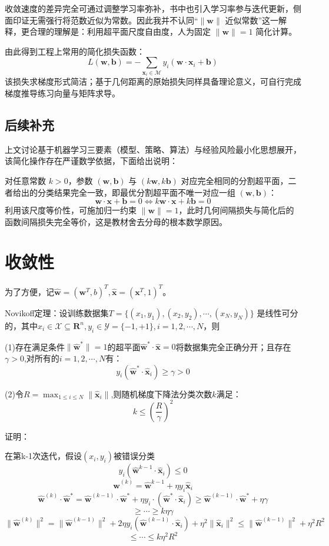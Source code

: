 \documentclass{article}
\begin{document}
收敛速度的差异完全可通过调整学习率弥补，书中也引入学习率参与迭代更新，侧面印证无需强行将范数近似为常数。因此我并不认同“$\|\boldsymbol{w}\|$ 近似常数”这一解释，更合理的理解是：利用超平面尺度自由度，人为固定 $\|\boldsymbol{w}\|=1$ 简化计算。

由此得到工程上常用的简化损失函数：
\[L(\boldsymbol{w},\boldsymbol{b})=-\sum_{\boldsymbol{x}_i\in \mathcal{M}}y_i(\boldsymbol{w}\cdot \boldsymbol{x}_i+\boldsymbol{b})\]
该损失求梯度形式简洁；基于几何距离的原始损失同样具备理论意义，可自行完成梯度推导练习向量与矩阵求导。

\subsection*{后续补充}
上文讨论基于机器学习三要素（模型、策略、算法）与经验风险最小化思想展开，该简化操作存在严谨数学依据，下面给出说明：

对任意常数 $k>0$，参数 $(\boldsymbol{w},\boldsymbol{b})$ 与 $(k\boldsymbol{w},k\boldsymbol{b})$ 对应完全相同的分割超平面，二者给出的分类结果完全一致，即最优分割超平面不唯一对应一组 $(\boldsymbol{w},\boldsymbol{b})$：
\[\boldsymbol{w}\cdot\boldsymbol{x}+\boldsymbol{b}=0 \iff k\boldsymbol{w}\cdot\boldsymbol{x}+k\boldsymbol{b}=0\]
利用该尺度等价性，可施加归一约束 $\|\boldsymbol{w}\|=1$，此时几何间隔损失与简化后的函数间隔损失完全等价，这是教材舍去分母的根本数学原因。

\section{收敛性}
为了方便，记$\widehat{\boldsymbol{w}}=(\boldsymbol{w}^T,b)^T,\widehat{\boldsymbol{x}}=(\boldsymbol{x}^T,1)^T $。

Novikoff定理：设训练数据集$T=\{(x_1,y_1),(x_2,y_2),\cdots,(x_N,y_N)\}$
是线性可分的，其中$x_i \in \mathcal{X} \subseteq \mathbf{R}^n,y_i\in \mathcal{Y}=\{-1,+1\} ,i=1,2,\cdots,N$，则

(1)存在满足条件$\|\boldsymbol{\widehat{w}^*}\|=1$的超平面$\boldsymbol{\boldsymbol{\widehat{w}}^* \cdot}
\boldsymbol{\widehat{x}}=0$将数据集完全正确分开；且存在$\gamma >0$,对所有的$i=1,2,\cdots,N$有：
\[y_i(\boldsymbol{\widehat{w}^*}\cdot {\widehat{\boldsymbol{x}}_i})\ge\gamma>0\]

(2)令$R=\max_{1\le i\le N}\|{\boldsymbol{\widehat{x}}}_i\|$,则随机梯度下降法分类次数$k$满足：
\[k \le (\frac{R}{\gamma})^2\]

证明：

在第k-1次迭代，假设$(x_i,y_i)$被错误分类
\[y_i(\widehat{\boldsymbol{w}}^{k-1}\cdot \widehat{\boldsymbol{x}}_i)\le0\]
\[\widehat{\boldsymbol{w}}^{(k)}=\widehat{\boldsymbol{w}}^{k-1}
+\eta y_i \widehat{\boldsymbol{x}}_i\]
\[\widehat{\boldsymbol{w}}^{(k)}\cdot \widehat{\boldsymbol{w}}^*=
\widehat{\boldsymbol{w}}^{(k-1)}\cdot \widehat{\boldsymbol{w}}^*+\eta y_i\cdot(\widehat{\boldsymbol{
w}}^*\cdot \widehat{\boldsymbol{x}}_i)\ge \widehat{\boldsymbol{w}}^{(k-1)}\cdot \widehat{\boldsymbol{w}}^* +\eta \gamma \]
\[\ge \cdots \ge k\eta\gamma\]
\[\|\widehat{\boldsymbol{w}}^{(k)}\|^2=\|\widehat{\boldsymbol{w}}^{(k-1)}\|^2+2\eta y_i(\widehat{\boldsymbol{w}}^{(k-1)}\cdot \widehat{\boldsymbol{x}}_i)+\eta ^2\|\widehat{\boldsymbol{x}}_i\|^2
\le \|\widehat{\boldsymbol{w}}^{(k-1)}\|^2+\eta^2R^2\]
\[\le \cdots \le k\eta^2R^2\]
\end{document}

